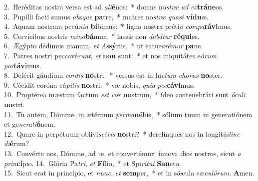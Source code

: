 {2.~}Heréditas nostra versa est ad \textit{a}\textit{li}\textbf{é}nos:~* domus no\textit{stræ} \textit{ad} \textit{ex}\textbf{trá}\textbf{ne}os.\\
{3.~}Pupílli facti sumus \textit{ab}s\textit{que} \textbf{pa}tre,~* matres no\textit{stræ} \textit{qua}\textit{si} \textbf{ví}\textbf{du}æ.\\
{4.~}Aquam nostram pecú\textit{ni}\textit{a} \textbf{bí}bimus:~* ligna nostra préti\textit{o} \textit{com}\textit{pa}\textbf{rá}\textbf{vi}mus.\\
{5.~}Cervícibus nostris \textit{mi}\textit{na}\textbf{bá}mur,~* lassis non \textit{da}\textit{bá}\textit{tur} \textbf{ré}\textbf{qui}es.\\
{6.~}Ægýpto dédimus manum, \textit{et} \textit{As}\textbf{sý}riis,~* ut satu\textit{ra}\textit{ré}\textit{mur} \textbf{pa}ne.\\
{7.~}Patres nostri peccavé\textit{runt}, \textit{et} \textbf{non} sunt:~* et nos iniquitátes e\textit{ó}\textit{rum} \textit{por}\textbf{tá}\textbf{vi}mus.\\
{8.~}Defécit gáudium \textit{cor}\textit{dis} \textbf{no}stri:~* versus est in lu\textit{ctum} \textit{cho}\textit{rus} \textbf{no}ster.\\
{9.~}Cécidit coróna cá\textit{pi}\textit{tis} \textbf{no}stri:~* væ nobis, \textit{qui}\textit{a} \textit{pec}\textbf{cá}\textbf{vi}mus.\\
{10.~}Proptérea mæstum factum \textit{est} \textit{cor} \textbf{no}strum,~* ídeo contenebráti sunt \textit{ó}\textit{cu}\textit{li} \textbf{no}stri.\\
{11.~}Tu autem, Dómine, in ætérnum \textit{per}\textit{ma}\textbf{né}bis,~* sólium tuum in generatiónem et ge\textit{ne}\textit{ra}\textit{ti}\textbf{ó}nem.\\
{12.~}Quare in perpétuum oblivi\textit{scé}\textit{ris} \textbf{no}stri?~* derelínques nos in longitú\textit{di}\textit{ne} \textit{di}\textbf{é}rum?\\
{13.~}Convérte nos, Dómine, ad te, et convertémur: ínnova dies nostros, sicut \textit{a} \textit{prin}\textbf{cí}pio.
{14.~}Glória Pa\textit{tri}, \textit{et} \textbf{Fí}lio,~* et Spi\textit{rí}\textit{tu}\textit{i} \textbf{San}cto.\\
{15.~}Sicut erat in princípio, et \textit{nunc}, \textit{et} \textbf{sem}per,~* et in sǽcula sæ\textit{cu}\textit{ló}\textit{rum}. \textbf{A}men.\\
